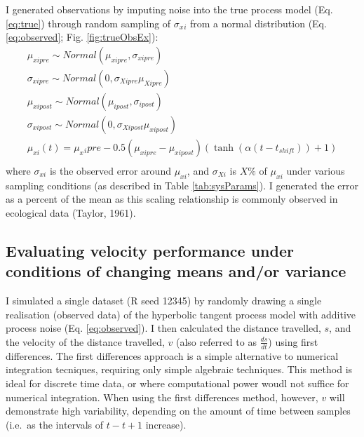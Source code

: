 \documentclass[12pt,twoside,openany]{reedthesis}
\begin{document}
I generated observations by imputing noise into the true process model (Eq. \eqref{eq:true}) through random sampling of \(\sigma_x{_i}\) from a normal distribution (Eq. \eqref{eq:observed}; Fig. \ref{fig:trueObsEx}):
\begin{equation}
\begin{array}{rcr}
\mu_{xipre}\sim Normal(\mu_{xipre},\sigma_{xipre}) \\ 
\sigma_{xipre} \sim Normal(0,\sigma_{Xipre}\mu_{Xipre}) \\
\mu_{xipost} \sim Normal(\mu_{ipost},\sigma_{ipost}) \\ 
\sigma_{xipost} \sim Normal(0,\sigma_{Xipost}\mu_{xipost}) \\
\mu_{xi}(t) = \mu_x{_ipre}  - 0.5(\mu_{xipre}-\mu_{xipost})(\tanh(\alpha (t-t_{shift}))+1) \\
\end{array}
\label{eq:observed}
\end{equation}
where \(\sigma_{xi}\) is the observed error around \(\mu_{xi}\), and \(\sigma_{Xi}\) is \(X\%\) of \(\mu_{xi}\) under various sampling conditions (as described in Table \ref{tab:sysParams}). I generated the error as a percent of the mean as this scaling relationship is commonly observed in ecological data (Taylor, 1961).

\hypertarget{evaluating-velocity-performance-under-conditions-of-changing-means-andor-variance}{%
\subsection{Evaluating velocity performance under conditions of changing means and/or variance}\label{evaluating-velocity-performance-under-conditions-of-changing-means-andor-variance}}

I simulated a single dataset (R seed 12345) by randomly drawing a single realisation (observed data) of the hyperbolic tangent process model with additive process noise (Eq. \eqref{eq:observed}). I then calculated the distance travelled, \(s\), and the velocity of the distance travelled, \(v\) (also referred to as \(\frac{ds}{dt}\)) using first differences. The first differences approach is a simple alternative to numerical integration tecniques, requiring only simple algebraic techniques. This method is ideal for discrete time data, or where computational power woudl not suffice for numerical integration. When using the first differences method, however, \(v\) will demonstrate high variability, depending on the amount of time between samples (i.e.~as the intervals of \(t-t+1\) increase).
\end{document}
